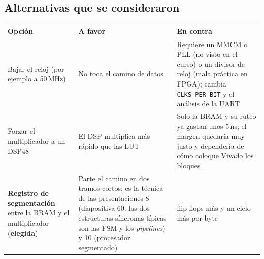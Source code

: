 \documentclass[11pt,a4paper]{article}
\begin{document}
\subsection{Alternativas que se consideraron}
\begin{center}
\small
\begin{tabularx}{\linewidth}{>{\raggedright\arraybackslash}p{3.6cm}>{\raggedright\arraybackslash}X>{\raggedright\arraybackslash}X}
\toprule
\textbf{Opción} & \textbf{A favor} & \textbf{En contra} \\
\midrule
Bajar el reloj (por ejemplo a 50\,MHz) & No toca el camino de datos & Requiere un MMCM o PLL (no visto en el curso) o un divisor de reloj (mala práctica en FPGA); cambia \texttt{CLKS\_PER\_BIT} y el análisis de la UART \\
Forzar el multiplicador a un DSP48 & El DSP multiplica más rápido que las LUT & Solo la BRAM y su ruteo ya gastan unos 5\,ns; el margen quedaría muy justo y dependería de cómo coloque Vivado los bloques \\
\textbf{Registro de segmentación} entre la BRAM y el multiplicador (\textbf{elegida}) & Parte el camino en dos tramos cortos; es la técnica de las presentaciones 8 (diapositiva 60: las dos estructuras síncronas típicas son las FSM y los \emph{pipelines}) y 10 (procesador segmentado) & 16 flip-flops más y un ciclo más por byte \\
\bottomrule
\end{tabularx}
\end{center}
\end{document}
